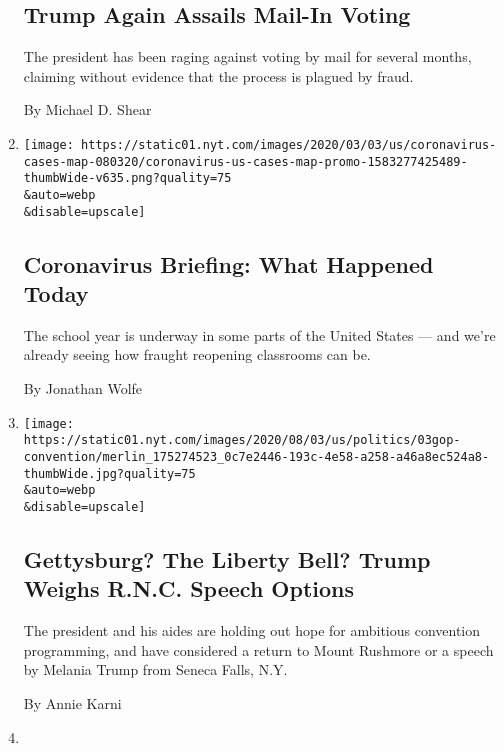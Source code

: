 \begin{enumerate}
{  \subsection{Trump Again Assails Mail-In
  Voting}\label{trump-again-assails-mail-in-voting}}

  The president has been raging against voting by mail for several
  months, claiming without evidence that the process is plagued by
  fraud.

  By Michael D. Shear
\item
  \href{/2020/08/03/us/coronavirus-today.html}{}

  \texttt{[image: https://static01.nyt.com/images/2020/03/03/us/coronavirus-cases-map-080320/coronavirus-us-cases-map-promo-1583277425489-thumbWide-v635.png?quality=75\\\&auto=webp\\\&disable=upscale]}

  \hypertarget{coronavirus-briefing-what-happened-today}{%
  \subsection{Coronavirus Briefing: What Happened
  Today}\label{coronavirus-briefing-what-happened-today}}

  The school year is underway in some parts of the United States --- and
  we're already seeing how fraught reopening classrooms can be.

  By Jonathan Wolfe
\item
  \href{/2020/08/03/us/politics/trump-rnc-speech.html}{}

  \texttt{[image: https://static01.nyt.com/images/2020/08/03/us/politics/03gop-convention/merlin\_175274523\_0c7e2446-193c-4e58-a258-a46a8ec524a8-thumbWide.jpg?quality=75\\\&auto=webp\\\&disable=upscale]}

  \hypertarget{gettysburg-the-liberty-bell-trump-weighs-rnc-speech-options}{%
  \subsection{Gettysburg? The Liberty Bell? Trump Weighs R.N.C. Speech
  Options}\label{gettysburg-the-liberty-bell-trump-weighs-rnc-speech-options}}

  The president and his aides are holding out hope for ambitious
  convention programming, and have considered a return to Mount Rushmore
  or a speech by Melania Trump from Seneca Falls, N.Y.

  By Annie Karni
\item
  \href{/2020/08/03/world/europe/italy-coronavirus-prostitution-sex-work.html}{}


\end{enumerate}
